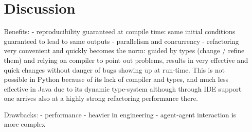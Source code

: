 \section{Discussion}
\label{sec:discussion}

Benefits:
- reproducibility guaranteed at compile time: same initial conditions guaranteed to lead to same outputs
- parallelism and concurrency
- refactoring very convenient and quickly becomes the norm: guided by types (change / refine them) and relying on compiler to point out problems, results in very effective and quick changes without danger of bugs showing up at run-time. This is not possible in Python because of its lack of compiler and types, and much less effective in Java due to its dynamic type-system although through IDE support one arrives also at a highly strong refactoring performance there.

Drawbacks:
- performance
- heavier in engineering
- agent-agent interaction is more complex